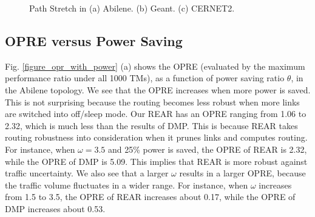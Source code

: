 \documentclass[conference]{IEEEtran}
\begin{document}
\begin{figure}[!t]
\centering
{}
\vspace{-0.1in}
\caption{Path Stretch in (a) Abilene. (b) Geant. (c) CERNET2.}
\label{figure_exp4_path}
\vspace{-0.1in}
\end{figure}

\subsection{OPRE versus Power Saving}
Fig. \ref{figure_opr_with_power} (a) shows the OPRE (evaluated by the maximum performance ratio under all 1000 TMs), as a function of power saving ratio $\theta$, in the Abilene topology. We see that the OPRE increases when more power is saved. This is not surprising because the routing becomes less robust when more links are switched into off/sleep mode. Our REAR has an OPRE ranging from 1.06 to 2.32, which is much less than the results of DMP. This is because REAR takes routing robustness into consideration when it prunes
links and computes routing. For instance, when $\omega = 3.5$ and 25\% power is saved, the OPRE of REAR is 2.32, while the OPRE of DMP is 5.09.
This implies that REAR is more robust against traffic uncertainty. We also see that a larger $\omega$ results in a larger OPRE, because
the traffic volume fluctuates in a wider range. For instance, when $\omega$ increases from 1.5 to 3.5, the OPRE of REAR increases about
0.17, while the OPRE of DMP increases about 0.53.
\end{document}
